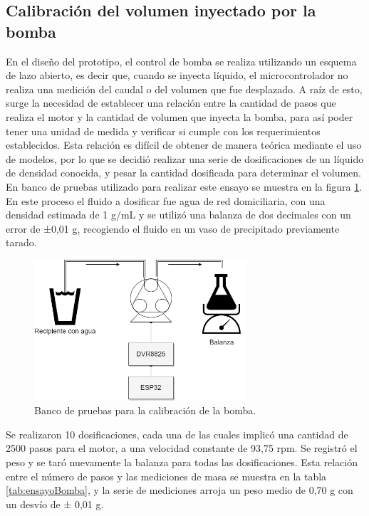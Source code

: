 \subsection{Calibración del volumen inyectado por la bomba}

En el diseño del prototipo, el control de bomba se realiza utilizando un esquema de lazo abierto, es decir que, cuando se inyecta líquido, el microcontrolador  no realiza una medición del caudal o del volumen que fue desplazado. A raíz de esto, surge la necesidad de establecer una relación entre la cantidad de pasos que realiza el motor y la cantidad de volumen que inyecta la bomba, para así poder tener una unidad de medida y verificar si cumple con los requerimientos establecidos. Esta relación es difícil de obtener de manera teórica mediante el uso de modelos, por lo que se decidió realizar una serie de dosificaciones de un líquido de densidad conocida, y pesar la cantidad dosificada para determinar el volumen. En banco de pruebas utilizado para realizar este ensayo se muestra en la figura \ref{fig:bancoPruebasBomba}. En este proceso el fluido a dosificar fue agua de red domiciliaria, con una densidad estimada de 1 g/mL y se utilizó una balanza de dos decimales con un error de ±0,01 g, recogiendo el fluido en un vaso de precipitado previamente tarado.

\begin{figure}[htbp]
	\centering
	\includegraphics[width=0.7\textwidth]{./Figures/bancoPruebasBomba.png}
	\caption{Banco de pruebas para la calibración de la bomba.}
	\label{fig:bancoPruebasBomba}
\end{figure}

Se realizaron 10 dosificaciones, cada una de las cuales implicó una cantidad de 2500 pasos para el motor, a una velocidad constante de 93,75 rpm. Se registró el peso y se taró nuevamente la balanza para todas las dosificaciones. Esta relación entre el número de pasos y las mediciones de masa se muestra en la tabla \ref{tab:ensayoBomba}, y la serie de mediciones arroja un peso medio de 0,70 g con un desvío de ± 0,01 g.

